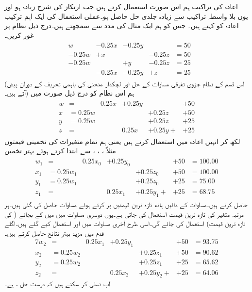 اعادہ کی تراکیب ہم اس صورت استعمال کرتے ہیں جب ارتکاز کی شرح زیادہ ہو اور یوں بلا واسطہ تراکیب سے زیادہ جلدی حل حاصل ہو۔عملی استعمال کی ایک اہم ترکیب اعادہ کو  کہتے ہیں۔  جس کو ہم ایک مثال کی مدد سے سمجھتے ہیں۔درج ذیل نظام پر غور کریں۔
\begin{gather}
\begin{alignedat} {5}\label{مساوات_خطی_اعدادی_مثال_الف}
&w&-0.25x&-0.25y&{}&=50\\
&-0.25w&+x&{}&-0.25z&=50\\
&-0.25w&{}&+y&-0.25z&=25\\
&{}&-0.25x&-0.25y&+z&=25
\end{alignedat}
\end{gather}
(اس قسم کے نظام جزوی تفرقی مساوات کے حل اور لچکدار منحنی کی  باہمی تحریف کے دوران پیش آتے ہیں۔) ہم اس نظام کو درج ذیل صورت میں 
\begin{gather}
\begin{alignedat}{6}\label{مساوات_خطی_اعدادی_مثال_ب}
w&={}&0.25x&+0.25y&{}&+50\\
x&=0.25w&{}&{}&+0.25z&+50\\
y&=0.25w&{}&{}&+0.25z&+25\\
z&=&{}&0.25x&+0.25y+{}&+25
\end{alignedat}
\end{gather}
لکھ کر انہیں اعادہ میں استعمال کرتے ہیں یعنی ہم تمام متغیرات کی تخمینی قیمتوں مثلاً ، ، ،  سے ابتدا کرتے ہوئے بہتر تخمین 
\begin{gather}
\begin{alignedat}{7}\label{مساوات_خطی_اعدادی_مثال_پ}
w_1&={}&0.25x_0&+0.25y_0&{}&+50&=100.00\\
x_1&=0.25w_1&{}&{}&+0.25z_0&+50&=100.00\\
y_1&=0.25w_1&{}&{}&+0.25z_0&+25&=75.00\\
z_1&=&{}&{}0.25x_1&+0.25y_1+{}&+25&=68.75
\end{alignedat}
\end{gather}
حاصل کرتے ہیں۔مساوات  کے دائیں ہاتھ تازہ ترین قیمتیں پر کرتے ہوئے مساوات  حاصل کی گئی ہیں۔ہر مرتبہ متغیر کی تازہ ترین قیمت استعمال کی جاتی ہے۔یوں دوسری مساوات میں  میں  کے بجائے ( کی تازہ ترین قیمت)  استعمال کی جائے گی۔اسی طرح آخری مساوات میں  اور  استعمال کیے گئے ہیں۔اگلے قدم میں مزید بہتر نتائج حاصل کرتے ہیں۔
\begin{alignat*}{7}
w_2&={}&0.25x_1&+0.25y_1&{}&+50&=93.75\\
x_2&=0.25w_2&{}&{}&+0.25z_1&+50&=90.62\\
y_2&=0.25w_2&{}&{}&+0.25z_1&+25&=65.62\\
z_2&=&{}&{}0.25x_2&+0.25y_2+{}&+25&=64.06
\end{alignat*}
آپ تسلی کر سکتے ہیں کہ درست حل ،  ہے۔


